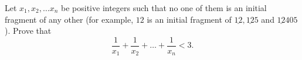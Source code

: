 Let $x_1,x_2,\ldots x_n$ be positive integers such that no one of them is an initial fragment of any other (for example, $12$ is an initial fragment of $\underline{12},\underline{12}5$ and $\underline{12}405$). Prove that\[\frac{1}{x_1}+\frac{1}{x_2}+\ldots+\frac{1}{x_n}<3. \]